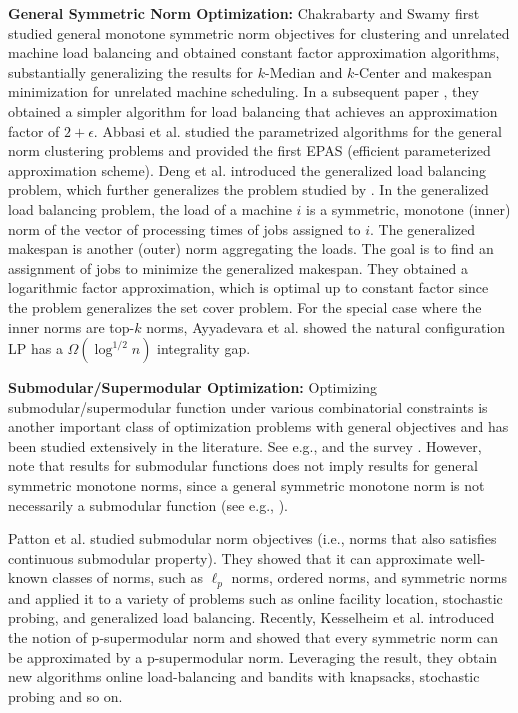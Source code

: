 \documentclass[11pt,a4paper]{article} \usepackage{enumitem}
\theoremstyle{definition}
\begin{document}
\vspace{0.2cm}
\noindent
{\bf General Symmetric Norm Optimization:}
Chakrabarty and Swamy \cite{chakrabarty2019approximation} first studied general monotone symmetric norm objectives for clustering and unrelated machine load balancing and obtained constant factor approximation algorithms, substantially generalizing the results for $k$-Median and $k$-Center and makespan minimization for unrelated machine scheduling. 
In a subsequent paper \cite{chakrabarty2019simpler}, they obtained a simpler algorithm for 
load balancing that achieves an approximation factor of $2+\epsilon$.
Abbasi et al. \cite{abbasi2023parameterized} studied the parametrized
algorithms for the general norm clustering problems
and provided the first EPAS (efficient parameterized approximation scheme).
Deng et al. \cite{deng2022generalized} introduced the generalized load balancing problem, 
which further generalizes the problem studied by \cite{chakrabarty2019simpler}. 
In the generalized load balancing problem, the load of a machine $i$ is a symmetric, monotone (inner) norm of the vector of processing times of jobs assigned to $i$. 
The generalized makespan is another (outer) norm aggregating the loads.
The goal is to find an assignment of jobs to minimize the generalized makespan.
They obtained a logarithmic factor approximation, which is optimal up to constant factor
since the problem generalizes the set cover problem.
For the special case where the inner norms are top-$k$ norms,
Ayyadevara et al. \cite{ayyadevara2023minimizing} showed the natural 
configuration LP has a $\Omega(\log^{1/2}n)$ integrality gap.

\vspace{0.2cm}
\noindent
{\bf Submodular/Supermodular Optimization:}
Optimizing submodular/supermodular function under various combinatorial constraints
is another important class of optimization problems with general objectives and  
has been studied extensively in the literature. See e.g., \cite{calinescu2007maximizing,lee2010submodular,chekuri2011submodular,buchbinder2014submodular} and the survey \cite{krause2014submodular}.
However, note that results for submodular functions
does not imply results for general symmetric monotone norms, since a general symmetric monotone norm is not necessarily a submodular function (see e.g., \cite{deng2022generalized}).

Patton et al. \cite{patton2023submodular} studied submodular norm objectives (i.e., norms that also satisfies continuous submodular property). They showed that it can approximate well-known classes of norms, such as $\ell_p$ norms, ordered norms, and symmetric norms and applied it to a variety of problems such as online facility location, stochastic probing, and generalized load balancing.
Recently, Kesselheim et al. \cite{kesselheim2024supermodular} introduced the notion of p-supermodular norm and showed that every symmetric norm can be approximated by a p-supermodular norm. Leveraging the result, they obtain new algorithms 
online load-balancing and bandits with knapsacks, stochastic probing and so on. 
\end{document}
